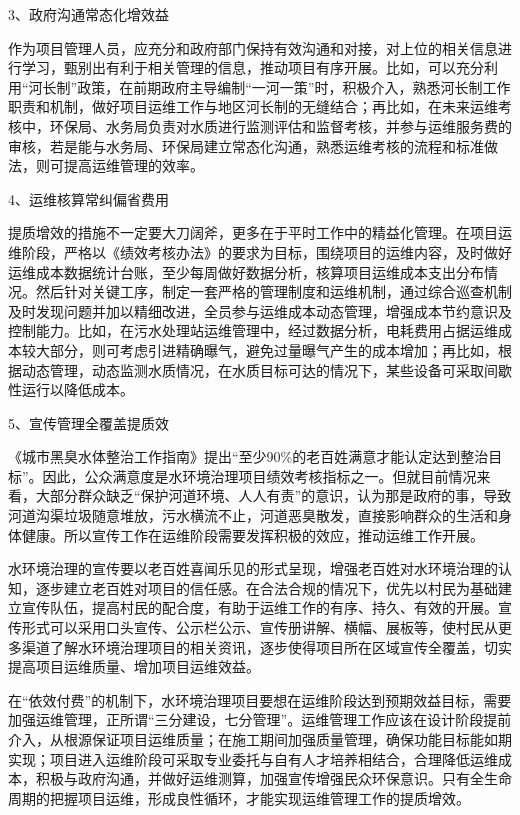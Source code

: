\documentclass[
]{book}
\begin{document}
3、政府沟通常态化增效益

作为项目管理人员，应充分和政府部门保持有效沟通和对接，对上位的相关信息进行学习，甄别出有利于相关管理的信息，推动项目有序开展。比如，可以充分利用``河长制''政策，在前期政府主导编制``一河一策''时，积极介入，熟悉河长制工作职责和机制，做好项目运维工作与地区河长制的无缝结合；再比如，在未来运维考核中，环保局、水务局负责对水质进行监测评估和监督考核，并参与运维服务费的审核，若是能与水务局、环保局建立常态化沟通，熟悉运维考核的流程和标准做法，则可提高运维管理的效率。

4、运维核算常纠偏省费用

提质增效的措施不一定要大刀阔斧，更多在于平时工作中的精益化管理。在项目运维阶段，严格以《绩效考核办法》的要求为目标，围绕项目的运维内容，及时做好运维成本数据统计台账，至少每周做好数据分析，核算项目运维成本支出分布情况。然后针对关键工序，制定一套严格的管理制度和运维机制，通过综合巡查机制及时发现问题并加以精细改进，全员参与运维成本动态管理，增强成本节约意识及控制能力。比如，在污水处理站运维管理中，经过数据分析，电耗费用占据运维成本较大部分，则可考虑引进精确曝气，避免过量曝气产生的成本增加；再比如，根据动态管理，动态监测水质情况，在水质目标可达的情况下，某些设备可采取间歇性运行以降低成本。

5、宣传管理全覆盖提质效

《城市黑臭水体整治工作指南》提出``至少90\%的老百姓满意才能认定达到整治目标''。因此，公众满意度是水环境治理项目绩效考核指标之一。但就目前情况来看，大部分群众缺乏``保护河道环境、人人有责''的意识，认为那是政府的事，导致河道沟渠垃圾随意堆放，污水横流不止，河道恶臭散发，直接影响群众的生活和身体健康。所以宣传工作在运维阶段需要发挥积极的效应，推动运维工作开展。

水环境治理的宣传要以老百姓喜闻乐见的形式呈现，增强老百姓对水环境治理的认知，逐步建立老百姓对项目的信任感。在合法合规的情况下，优先以村民为基础建立宣传队伍，提高村民的配合度，有助于运维工作的有序、持久、有效的开展。宣传形式可以采用口头宣传、公示栏公示、宣传册讲解、横幅、展板等，使村民从更多渠道了解水环境治理项目的相关资讯，逐步使得项目所在区域宣传全覆盖，切实提高项目运维质量、增加项目运维效益。

在``依效付费''的机制下，水环境治理项目要想在运维阶段达到预期效益目标，需要加强运维管理，正所谓``三分建设，七分管理''。运维管理工作应该在设计阶段提前介入，从根源保证项目运维质量；在施工期间加强质量管理，确保功能目标能如期实现；项目进入运维阶段可采取专业委托与自有人才培养相结合，合理降低运维成本，积极与政府沟通，并做好运维测算，加强宣传增强民众环保意识。只有全生命周期的把握项目运维，形成良性循环，才能实现运维管理工作的提质增效。
\end{document}
